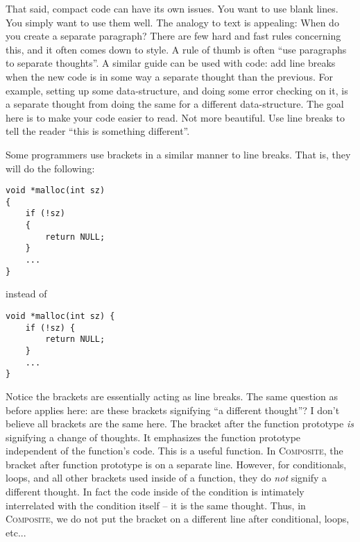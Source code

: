 \documentclass[11pt,onecolumn]{article}
\def\composite{\textsc{Composite}}
\newcommand{\head}[1]{\vspace{0.4em}\noindent{\bf #1}}
\begin{document}
That said, compact code can have its own issues.  You want to use
blank lines.  You simply want to use them well.  The analogy to text
is appealing: When do you create a separate paragraph?  There are few
hard and fast rules concerning this, and it often comes down to style.
A rule of thumb is often ``use paragraphs to separate thoughts''.  A
similar guide can be used with code: add line breaks when the new code
is in some way a separate thought than the previous.  For example,
setting up some data-structure, and doing some error checking on it,
is a separate thought from doing the same for a different
data-structure.  The goal here is to make your code easier to read.
Not more beautiful.  Use line breaks to tell the reader ``this is
something different''.

\head{On using brackets as line breaks.}  Some programmers use
brackets in a similar manner to line breaks.  That is, they will do
the following:

    \begin{minipage}{3in}
      \footnotesize
      \lstset{language=C}
      \begin{lstlisting}
void *malloc(int sz)
{
    if (!sz)
    {
        return NULL;
    }
    ...
}
      \end{lstlisting}
    \end{minipage}

instead of

    \begin{minipage}{3in}
      \footnotesize
      \lstset{language=C}
      \begin{lstlisting}
void *malloc(int sz) {
    if (!sz) {
        return NULL;
    }
    ...
}
      \end{lstlisting}
    \end{minipage}

Notice the brackets are essentially acting as line breaks.  The same
question as before applies here: are these brackets signifying ``a
different thought''?  I don't believe all brackets are the same here.
The bracket after the function prototype {\em is} signifying a change
of thoughts.  It emphasizes the function prototype independent of the
function's code.  This is a useful function.  In \composite , the
bracket after function prototype is on a separate line.  However, for
conditionals, loops, and all other brackets used inside of a function,
they do {\em not} signify a different thought.  In fact the code
inside of the condition is intimately interrelated with the condition
itself -- it is the same thought.  Thus, in \composite , we do not put
the bracket on a different line after conditional, loops, etc...
\end{document}

